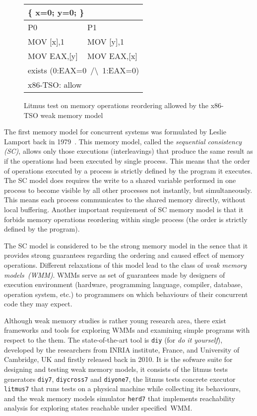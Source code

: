 \begin{figure}
\small \ttfamily
\begin{tabular}{ |l|l| }
\hline
\multicolumn{2}{|l|}{ \{ x=0; y=0; \}} \tabularnewline \hline
P0 & P1 \\ \hline
MOV [x],1 & MOV [y],1 \\
MOV EAX,[y] & MOV EAX,[x] \\
\hline
\multicolumn{2}{|l|}{exists (0:EAX=0~/\textbackslash~1:EAX=0)} \tabularnewline
\hline
\multicolumn{2}{|l|}{x86-TSO: allow} \tabularnewline
\hline

\end{tabular}
\caption{Litmus test on memory operations reordering allowed by the x86-TSO weak memory model}
\label{simple_wmm_x86}
\end{figure}

The first memory model for concurrent systems was formulated by Leslie Lamport back in 1979~\cite{lamport1979make}. This memory model, called the \textit{sequential consistency (SC)}, allows only those executions (interleavings) that produce the same result as if the operations had been executed by single process. This means that the order of operations executed by a process is strictly defined by the program it executes. The SC model does requires the write to a shared variable performed in one process to become visible by all other processes not instantly, but simultaneously. This means each process communicates to the shared memory directly, without local buffering. Another important requirement of SC memory model is that it forbids memory operations reordering within single process (the order is strictly defined by the program).

The SC model is considered to be the strong memory model in the sence that it provides strong guarantees regarding the ordering and caused effect of memory operations. Different relaxations of this model lead to the class of \textit{weak memory models~(WMM)}.
WMMs serve as set of guarantees made by designers of execution environment (hardware, programming language, compiler, database, operation system, etc.) to programmers on which behaviours of their concurrent code they may expect. 

Although weak memory studies is rather young research area, there exist frameworks and tools for exploring WMMs and examining simple programs with respect to the them. The state-of-the-art tool is \texttt{diy} (for \textit{do it yourself}), developed by the researchers from INRIA institute, France, and University of Cambridge, UK and firstly released back in 2010. It is the sofware suite for designing and testing weak memory models, it consists of the litmus tests generators \texttt{diy7}, \texttt{diycross7} and \texttt{diyone7}, the litmus tests concrete executor \texttt{litmus7} that runs tests on a physical machine while collecting its behaviours, and the weak memory models simulator \texttt{herd7} that implements reachability analysis for exploring states reachable under specified~WMM.

